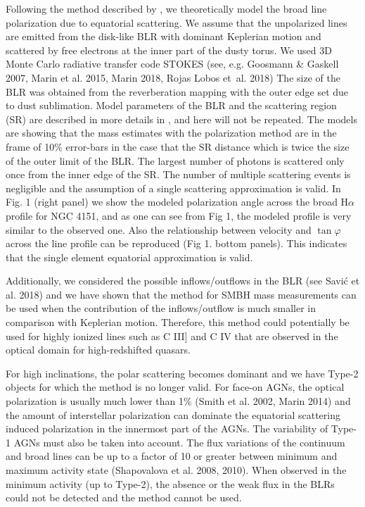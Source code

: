 \documentclass{iau}
\begin{document}
Following the method described by \cite{ap15}, 
we theoretically model the broad line polarization due to equatorial scattering. 
We assume that the unpolarized lines are emitted from the disk-like BLR with dominant
Keplerian motion and scattered by free electrons at the inner part of the dusty torus.
We used 3D Monte Carlo radiative transfer code \textsc{STOKES} 
(see, e.g. Goosmann \& Gaskell 2007, Marin et al. 2015, Marin 2018, Rojas Lobos et~al. 2018) 
 The size of the BLR was obtained from the reverberation mapping with the outer edge set due to 
 dust sublimation. Model parameters of the BLR and the scattering region (SR) are 
 described in more details in \cite{sa18}, and here will not be repeated.
 The models are showing that the mass estimates with the polarization method
 are in the frame of 10\% error-bars in the case that the 
 SR distance which is twice the size of the 
 outer limit of the BLR. The largest number of photons is  scattered only once from the 
 inner edge of the SR. The number of multiple scattering events is negligible and 
 the assumption of a single scattering approximation is valid. In Fig. 1 (right panel) we 
 show the modeled polarization angle across the broad H$\alpha$ profile for NGC 4151, and 
 as one can see from Fig 1, the modeled profile is very similar to the observed one. Also
 the relationship between velocity  and $\tan\varphi$ across the line profile can  be 
 reproduced (Fig 1. bottom panels).
 This indicates that the single element equatorial approximation is valid.
 
 Additionally, we considered the possible inflows/outflows in the BLR 
 (see Savi\'c et al. 2018) and we  have shown that the method for 
 SMBH mass measurements can be used when the contribution of the
 inflows/outflow is much smaller
 in comparison with Keplerian motion. Therefore, this method could potentially be used for highly 
 ionized lines such as C III] and C IV that are observed  in the optical domain  for 
 high-redshifted quasars. 

For high  inclinations, the polar scattering becomes dominant and we have Type-2 objects 
for which the method is no longer valid. For face-on AGNs, the optical polarization is usually 
much lower than 1\% (Smith et al. 2002, Marin 2014) and the amount of interstellar polarization 
can dominate  the equatorial scattering induced polarization in the innermost part of the AGNs. 
The variability of Type-1 AGNs must also be taken into account. The flux variations of the 
continuum and  broad lines can be up to a factor of 10 or greater between minimum and 
maximum activity state (Shapovalova et al. 2008, 2010).
When observed in the minimum activity (up to Type-2), the absence or the weak 
flux in the BLRs could not be detected and the method cannot be used.
\end{document}
